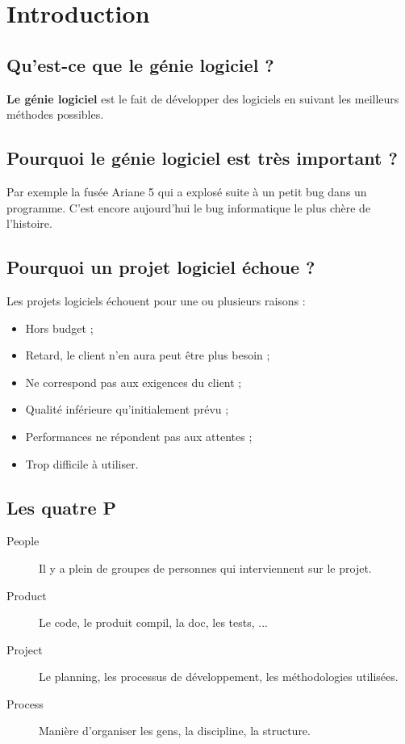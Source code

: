 \section{Introduction}



\subsection{Qu'est-ce que le génie logiciel ?}
\textbf{Le génie logiciel} est le fait de développer des logiciels en suivant les meilleurs méthodes possibles.



\subsection{Pourquoi le génie logiciel est très important ?}
Par exemple la fusée Ariane 5 qui a explosé suite à un petit bug dans un programme. C'est encore aujourd'hui le bug informatique le plus chère de l'histoire.



\subsection{Pourquoi un projet logiciel échoue ?}
Les projets logiciels échouent pour une ou plusieurs raisons :
\begin{itemize}
    \item Hors budget ;
    \item Retard, le client n'en aura peut être plus besoin ;
    \item Ne correspond pas aux exigences du client ;
    \item Qualité inférieure qu'initialement prévu ;
    \item Performances ne répondent pas aux attentes ;
    \item Trop difficile à utiliser.
\end{itemize}



\subsection{Les quatre P}
\begin{description}
    \item [People] Il y a plein de groupes de personnes qui interviennent sur le projet.
    \item [Product] Le code, le produit compil, la doc, les tests, ...
    \item [Project] Le planning, les processus de développement, les méthodologies utilisées.
    \item [Process] Manière d'organiser les gens, la discipline, la structure.
\end{description}



